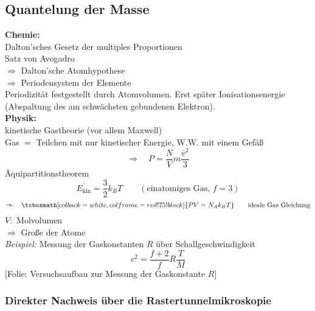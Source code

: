 \documentclass[titlepage,11pt,a4paper,ngerman]{report}
\newcommand{\tx}[1]{\textrm{#1}}
\newcommand{\ol}[1]{\overline{#1}}
\newcommand{\folie}[1]{\color{gray}[Folie: #1]\color{black}}
\newcommand{\rmbox}[1]{\tcboxmath[colback=white,colframe=red!75!black]{#1}}
\begin{document}
\subsection{Quantelung der Masse}

\textbf{Chemie:}\\
Dalton'sches Gesetz der multiples Proportionen\\
Satz von Avogadro\\[5pt]
$ \Rightarrow $ Dalton'sche Atomhypothese\\
$ \Rightarrow $ Periodensystem der Elemente\\[5pt]
Periodizität festgestellt durch Atomvolumen. Erst später Ionisationsenergie (Abspaltung des am schwächsten gebundenen Elektron).\\[5pt]
\textbf{Physik:}\\
kinetische Gastheorie (vor allem Maxwell)\\
Gas $ = $ Teilchen mit nur kinetischer Energie, W.W. mit einem Gefäß
\begin{equation*}
\Rightarrow \quad P = \frac{N}{V} m \frac{\ol{v}^2}{3}
\end{equation*}
Äquipartitionstheorem
\begin{equation*}
\ol{E_{\tx{kin}}} = \frac{3}{2} k_B T \qquad (\tx{einatomiges Gas, } f = 3)
\end{equation*}
\begin{equation*}
\Rightarrow \quad \rmbox{P V = N_A k_B T} \qquad \tx{ideale Gas Gleichung}
\end{equation*}
$ V : $ Molvolumen\\
$ \Rightarrow $ Große der Atome\\[5pt]
\emph{Beispiel:} Messung der Gaskonstanten $ R $ über Schallgeschwindigkeit\\
\begin{equation*}
c^2 = \frac{f + 2}{f} R \frac{T}{M} 
\end{equation*}
\folie{Versuchsaufbau zur Messung der Gaskonstante $ R $}

\subsubsection{Direkter Nachweis über die Rastertunnelmikroskopie}


\end{document}
